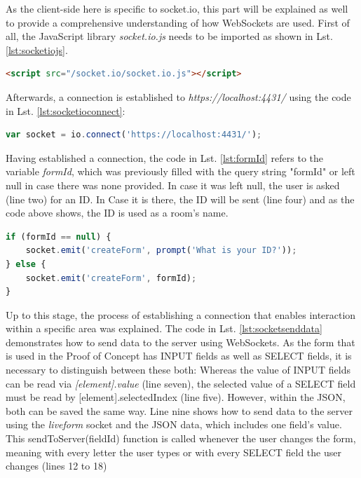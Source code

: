 As the client-side here is specific to socket.io, this part will be explained as well to provide a comprehensive understanding of how WebSockets are used. First of all, the JavaScript library \textit{socket.io.js} needs to be imported as shown in Lst. \ref{lst:socketiojs}.

\begin{lstlisting}[language=html,
caption={Including the client-side socket.io JavaScript},
label=lst:socketiojs]
<script src="/socket.io/socket.io.js"></script>
\end{lstlisting}

Afterwards, a connection is established to \textit{https://localhost:4431/} using the code in Lst. \ref{lst:socketioconnect}:

\begin{lstlisting}[language=javascript,caption={Establishing socket.io connection from the client-side},label=lst:socketioconnect]
var socket = io.connect('https://localhost:4431/');
\end{lstlisting}

Having established a connection, the code in Lst. \ref{lst:formId} refers to the variable \textit{formId}, which was previously filled with the query string "formId" or left null in case there was none provided. In case it was left null, the user is asked (line two) for an ID. In Case it is there, the ID will be sent (line four) and as the code above shows, the ID is used as a room's name.

\begin{lstlisting}[language=javascript,caption={Joining a specific area – "room"},label=lst:formId]
if (formId == null) {
	socket.emit('createForm', prompt('What is your ID?'));
} else {
	socket.emit('createForm', formId);
}
\end{lstlisting}

Up to this stage, the process of establishing a connection that enables interaction within a specific area was explained. The code in Lst. \ref{lst:socketsenddata} demonstrates how to send data to the server using WebSockets. As the form that is used in the Proof of Concept has INPUT fields as well as SELECT fields, it is necessary to distinguish between these both: Whereas the value of INPUT fields can be read via \textit{[element].value} (line seven), the selected value of a SELECT field must be read by [element].selectedIndex (line five). However, within the JSON, both can be saved the same way. Line nine shows how to send data to the server using the \textit{liveform} socket and the JSON data, which includes one field's value. This sendToServer(fieldId) function is called whenever the user changes the form, meaning with every letter the user types or with every SELECT field the user changes (lines 12 to 18)

